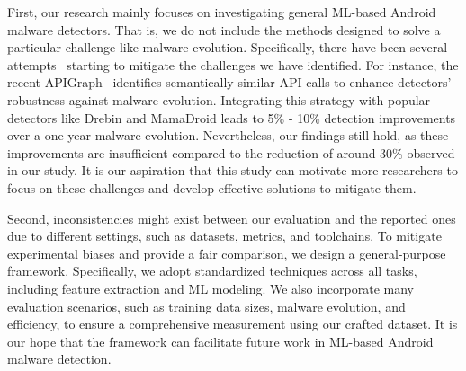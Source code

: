 First, our research mainly focuses on investigating general ML-based Android malware detectors.
That is, we do not include the methods designed to solve a particular challenge like malware evolution.
Specifically, there have been several attempts~\cite{narayanan2016adaptive,zhang2020enhancing,chen2023continuous,xu2019droidevolver} starting to mitigate the challenges we have identified.
For instance, the recent APIGraph~\cite{zhang2020enhancing} identifies semantically similar API calls to enhance detectors' robustness against malware evolution.
Integrating this strategy with popular detectors like Drebin and MamaDroid leads to 5\% - 10\% detection improvements over a one-year malware evolution.
Nevertheless, our findings still hold, as these improvements are insufficient compared to the reduction of around 30\% observed in our study.
It is our aspiration that this study can motivate more researchers to focus on these challenges and develop effective solutions to mitigate them.

Second, inconsistencies might exist between our evaluation and the reported ones due to different settings, such as datasets, metrics, and toolchains.
To mitigate experimental biases and provide a fair comparison, we design a general-purpose framework.
Specifically, we adopt standardized techniques across all tasks, including feature extraction and ML modeling.
We also incorporate many evaluation scenarios, such as training data sizes, malware evolution, and efficiency, to ensure a comprehensive measurement using our crafted dataset.
It is our hope that the framework can facilitate future work in ML-based Android malware detection.
